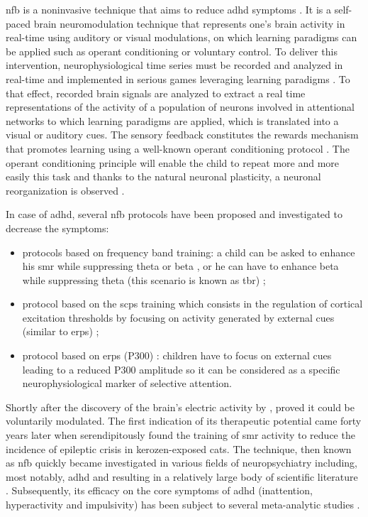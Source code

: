 \gls{nfb} is a noninvasive technique that aims to reduce \gls{adhd} symptoms \citep{Arns2015, Steffert2010, Marzbani2016}.
It is a self-paced brain neuromodulation technique that represents one's brain activity in real-time using auditory or 
visual modulations, on which learning paradigms can be applied such as operant conditioning \citep{Reynolds1975} or voluntary control.
To deliver this intervention, neurophysiological time series must be recorded and analyzed in real-time and implemented in serious games 
leveraging learning paradigms \citep{Wang2010}. To that effect, recorded brain signals are analyzed to extract a real time representations of the activity 
of a population of neurons involved in attentional networks to which learning paradigms are applied, which is translated into a visual 
or auditory cues. The sensory feedback constitutes the rewards mechanism that promotes learning using a well-known operant conditioning protocol \citep{Sherlin2011}. 
The operant conditioning principle will enable the child to repeat more and more easily this task \citep{Skinner1961} and thanks to the natural neuronal plasticity,
a neuronal reorganization is observed \citep{VanDoren2017}. 

In case of \gls{adhd}, several \gls{nfb} protocols have been proposed and investigated to decrease the symptoms: 
\begin{itemize}
	\item protocols based on frequency band training: a child can be asked to enhance his \gls{smr} 
	while suppressing theta or beta \citep{Lubar1976}, or he can have to enhance beta
	while suppressing theta (this scenario is known as \gls{tbr}) \citep{Arns2013};
	\item protocol based on the \glspl{scp} training which consists in the regulation of cortical excitation 
	thresholds by focusing on activity generated by external cues 
	(similar to \glspl{erp}) \citep{Heinrich2004, Banaschewski2007}; 
	\item protocol based on \glspl{erp} (P300) \citep{Fouillen2017}: children have to focus on
	external cues leading to a reduced P300 amplitude so it can be considered as a specific 
	neurophysiological marker of selective attention. 
\end{itemize} 

Shortly after the discovery of the brain's electric activity by \citet{Berger1929}, \citet{Durup1935} proved it could be voluntarily modulated. 
The first indication of its therapeutic potential came forty years later when \citet{Sterman1974} serendipitously found the training of \gls{smr} 
activity to reduce the incidence of epileptic crisis in kerozen-exposed cats. The technique, then known as \gls{nfb} quickly became investigated in 
various fields of neuropsychiatry including, most notably, \gls{adhd} and resulting in a relatively large body of scientific literature 
\citep{Lubar1976, Rossiter1995, Linden1996, Maurizio2014}. Subsequently, its efficacy on the core symptoms of \gls{adhd} (inattention, hyperactivity 
and impulsivity) has been subject to several meta-analytic studies \citep{Loo2005, Lofthouse2012, Arns2009, Micoulaud2014, Sonuga-Barke2013}. 


